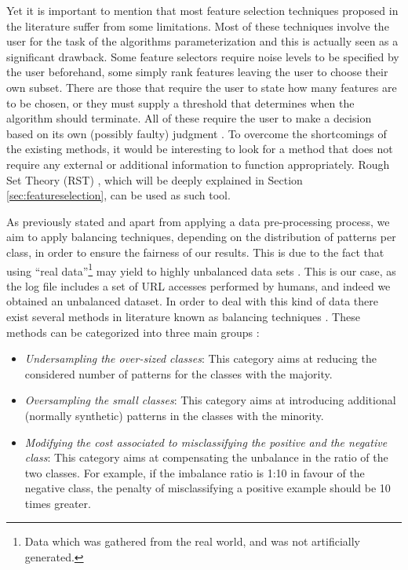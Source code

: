\documentclass{llncs}
\begin{document}
Yet it is important to mention that most feature selection techniques
proposed in the literature suffer from some limitations. Most of these techniques involve the user for the task of the algorithms parameterization and this is actually seen as a significant drawback. Some feature selectors require noise levels to be specified by the user beforehand, some simply rank features leaving the user to choose their own subset. There are those that require the user to state how many features are to be chosen, or they must supply a threshold that determines when the algorithm should terminate. All of these require the user to make a decision based on its own (possibly faulty) judgment \cite{jensen2005semantics}. To overcome the shortcomings of the existing methods, it would be interesting to look for a method that does not require any external or additional information to function appropriately. Rough Set Theory (RST) \cite{pawlak2008rough}, which will be deeply explained in Section \ref{sec:featureselection}, can be used as such tool. 
 
As previously stated and apart from applying a data pre-processing process, we aim to apply balancing techniques, depending on the distribution of patterns per class, in order to ensure the fairness of our results. This is due to the fact that using ``real data''\footnote{Data which was gathered from the real world, and was not artificially generated.} may yield to highly unbalanced data sets \cite{imbalanced_data_05}. This is our case, as the log file includes a set of URL accesses performed by humans, and indeed we obtained an unbalanced dataset. In order to deal with this kind of data there exist several methods in literature known as balancing techniques \cite{imbalanced_data_05}. These methods can be categorized into three main groups \cite{imbalance_techniques_02}: 

\begin{itemize}
\item \textit{Undersampling the over-sized classes}: This category aims at reducing the considered number of patterns for the classes with the majority.
\item \textit{Oversampling the small classes}: This category aims at introducing additional (normally synthetic) patterns in the classes with the minority.
\item \textit{Modifying the cost associated to misclassifying the positive and the negative class}: This category aims at compensating the unbalance in the ratio of the two classes. For example, if the imbalance ratio is 1:10 in favour of the negative class, the penalty of misclassifying a positive example should be 10 times greater.
\end{itemize}
\end{document}
